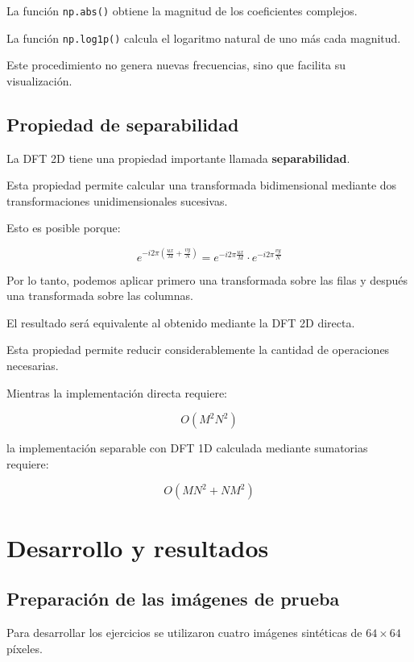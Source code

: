 \documentclass[11pt,letterpaper]{article}
\begin{document}
La función \texttt{np.abs()} obtiene la magnitud
de los coeficientes complejos.

La función \texttt{np.log1p()} calcula
el logaritmo natural de uno más cada magnitud.

Este procedimiento no genera nuevas frecuencias,
sino que facilita su visualización.

\subsection{Propiedad de separabilidad}

La DFT 2D tiene una propiedad importante llamada
\textbf{separabilidad}.

Esta propiedad permite calcular una transformada
bidimensional mediante dos transformaciones
unidimensionales sucesivas.

Esto es posible porque:

\begin{equation}
e^{-i2\pi\left(
\frac{ux}{M}+\frac{vy}{N}
\right)}
=
e^{-i2\pi\frac{ux}{M}}
\cdot
e^{-i2\pi\frac{vy}{N}}
\end{equation}

Por lo tanto, podemos aplicar primero una
transformada sobre las filas y después
una transformada sobre las columnas.

El resultado será equivalente al obtenido
mediante la DFT 2D directa.

Esta propiedad permite reducir considerablemente
la cantidad de operaciones necesarias.

Mientras la implementación directa requiere:

\[
O(M^2N^2)
\]

la implementación separable con DFT 1D
calculada mediante sumatorias requiere:

\[
O(MN^2+NM^2)
\]

\section{Desarrollo y resultados}

\subsection{Preparación de las imágenes de prueba}

Para desarrollar los ejercicios se utilizaron cuatro
imágenes sintéticas de $64\times64$ píxeles.
\end{document}

